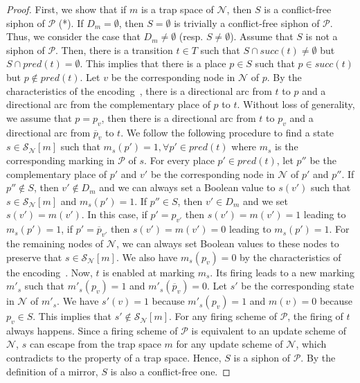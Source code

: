 \documentclass[preprint,12pt]{elsarticle}
\begin{document}
\begin{proof}

  First, we show that if \(m\) is a trap space of \(\mathcal{N}\), then \(S\) is a conflict-free siphon of \(\mathcal{P}\) (*). 
  If \(D_m = \emptyset\), then \(S = \emptyset\) is trivially a conflict-free siphon of \(\mathcal{P}\). 
  Thus, we consider the case that \(D_m \neq \emptyset\) (resp. \(S \neq \emptyset\)).
  Assume that \(S\) is not a siphon of \(\mathcal{P}\). 
  Then, there is a transition \(t \in T\) such that \(S \cap succ(t) \neq \emptyset\) but \(S \cap pred(t) = \emptyset\).
  This implies that there is a place \(p \in S\) such that \(p \in succ(t)\) but \(p \not \in pred(t)\).
  Let \(v\) be the corresponding node in \(\mathcal{N}\) of \(p\). 
  By the characteristics of the encoding~\cite{chaouiya2004qualitative}, there is a directional arc from \(t\) to \(p\) and a directional arc from the complementary place of \(p\) to \(t\).
  Without loss of generality, we assume that \(p = p_v\), then there is a directional arc from \(t\) to \(p_v\) and a directional arc from \(\overline{p}_v\) to \(t\).
  We follow the following procedure to find a state \(s \in \mathcal{S}_{\mathcal{N}}[m]\) such that \(m_s(p') = 1, \forall p' \in pred(t)\) where \(m_s\) is the corresponding marking in \(\mathcal{P}\) of \(s\).
  For every place \(p' \in pred(t)\), let \(p''\) be the complementary place of \(p'\) and \(v'\) be the corresponding node in \(\mathcal{N}\) of \(p'\) and \(p''\).
  If \(p'' \not \in S\), then \(v' \not \in D_m\) and we can always set a Boolean value to \(s(v')\) such that \(s \in \mathcal{S}_{\mathcal{N}}[m]\) and \(m_s(p') = 1\).
  If \(p'' \in S\), then \(v' \in D_m\) and we set \(s(v') = m(v')\).
  In this case, if \(p' = p_{v'}\) then \(s(v') = m(v') = 1\) leading to \(m_s(p') = 1\), if \(p' = \overline{p}_{v'}\) then \(s(v') = m(v') = 0\) leading to \(m_s(p') = 1\).
  For the remaining nodes of \(\mathcal{N}\), we can always set Boolean values to these nodes to preserve that \(s \in \mathcal{S}_{\mathcal{N}}[m]\).
  We also have \(m_s(p_v) = 0\) by the characteristics of the encoding~\cite{chaouiya2004qualitative}.
  Now, \(t\) is enabled at marking \(m_s\).
  Its firing leads to a new marking \(m'_s\) such that \(m'_s(p_v) = 1\) and \(m'_s(\overline{p}_v) = 0\). 
  Let \(s'\) be the corresponding state in \(\mathcal{N}\) of \(m'_s\).
  We have \(s'(v) = 1\) because \(m'_s(p_v) = 1\) and \(m(v) = 0\) because \(p_v \in S\).
  This implies that \(s' \not \in \mathcal{S}_{\mathcal{N}}[m]\).
  For any firing scheme of \(\mathcal{P}\), the firing of \(t\) always happens.
  Since a firing scheme of \(\mathcal{P}\) is equivalent to an update scheme of \(\mathcal{N}\), \(s\) can escape from the trap space \(m\) for any update scheme of \(\mathcal{N}\), which contradicts to the property of a trap space.
  Hence, \(S\) is a siphon of \(\mathcal{P}\).
  By the definition of a mirror, \(S\) is also a conflict-free one.


\end{proof}
\end{document}
